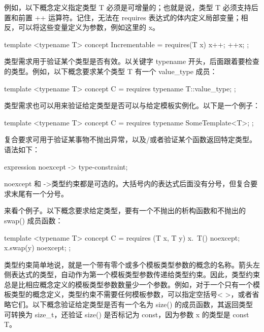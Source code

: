 例如，以下概念定义指定类型 T 必须是可增量的；也就是说，类型 T 必须支持后置和前置 ++ 运算符。记住，无法在 requires 表达式的体内定义局部变量；相反，可以将这些变量定义为参数，例如这里的 x。

\begin{cpp}
template <typename T>
concept Incrementable = requires(T x) { x++; ++x; };
\end{cpp}


类型需求用于验证某个类型是否有效。以关键字 typename 开头，后面跟着要检查的类型。例如，以下概念要求某个类型 T 有一个 value\_type 成员：

\begin{cpp}
template <typename T>
concept C = requires { typename T::value_type; };
\end{cpp}

类型需求也可以用来验证给定类型是否可以与给定模板实例化。以下是一个例子：

\begin{cpp}
template <typename T>
concept C = requires { typename SomeTemplate<T>; };
\end{cpp}



复合要求可用于验证某事物不抛出异常，以及/或者验证某个函数返回特定类型。语法如下：

\begin{cpp}
{ expression } noexcept -> type-constraint;
\end{cpp}

noexcept 和 ->类型约束都是可选的。大括号内的表达式后面没有分号，但复合要求末尾有一个分号。

来看个例子。以下概念要求给定类型，要有一个不抛出的析构函数和不抛出的 swap() 成员函数：

\begin{cpp}
template <typename T>
concept C = requires (T x, T y) {
    { x.~T()} noexcept;
    { x.swap(y) } noexcept;
};
\end{cpp}

类型约束简单地说，就是一个带有零个或多个模板类型参数的概念的名称。箭头左侧表达式的类型，自动作为第一个模板类型参数传递给类型约束。因此，类型约束总是比相应概念定义的模板类型参数数量少一个参数。例如，对于一个只有一个模板类型的概念定义，类型约束不需要任何模板参数，可以指定空括号< >，或者省略它们。以下概念验证给定类型是否有一个名为 size() 的成员函数，其返回类型可转换为 size\_t，还验证 size() 是否标记为 const，因为参数 x 的类型是 const T。

